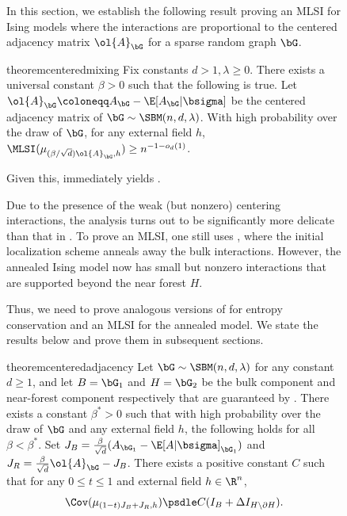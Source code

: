 \documentclass[11pt,letterpaper]{article}
\begin{document}
\begin{figure}
In this section, we establish the following result proving an MLSI for Ising models where the interactions are proportional to the centered adjacency matrix $\ol{A}_{\bG}$ for a sparse random graph $\bG$.

\begin{restatable}{theorem}{centeredmixing}
    \label{thm:main-centered-mixing}
    Fix constants $d > 1, \lambda \geq 0$. There exists a universal constant $\beta > 0$ such that the following is true. Let $\ol{A}_{\bG} \coloneqq A_{\bG} - \E[A_{\bG}|\bsigma]$ be the centered adjacency matrix of $\bG \sim \SBM(n, d, \lambda)$. With high probability over the draw of $\bG$, for any external field $h$, $\MLSI(\mu_{(\beta/\sqrt{d})\ol{A}_{\bG}, h}) \ge n^{-1-o_d(1)}$. 
\end{restatable}
Given this,  immediately yields .

Due to the presence of the weak (but nonzero) centering interactions, the analysis turns out to be significantly more delicate than that in . To prove an MLSI, one still uses , where the initial localization scheme anneals away the bulk interactions.
However, the annealed Ising model now has small but nonzero interactions that are supported beyond the near forest $H$. 

Thus, we need to prove analogous versions of  for entropy conservation and an MLSI for the annealed model.
We state the results below and prove them in subsequent sections.

\begin{restatable}{theorem}{centeredadjacency}
    \label{thm:centered-adjacency}
    Let $\bG \sim \SBM(n, d, \lambda)$ for any constant $d\ge 1$, and let $B = \bG_1$ and $H = \bG_2$ be the bulk component and near-forest component respectively that are guaranteed by .     
    There exists a constant $\beta^* > 0$ such that with high probability over the draw of $\bG$ and any external field $h$, the following holds for all $\beta < \beta^*$. Set $J_B = \frac{\beta}{\sqrt{d}}(A_{\bG_1} - \E[A| \bsigma]_{\bG_1})$ and $J_R = \frac{\beta}{\sqrt{d}}\ol{A}_{\bG} - J_B$. There exists a positive constant $C$ such that for any $0 \le t \le 1$ and external field $h \in \R^n$,
    \[ \Cov(\mu_{(1-t)J_B+ J_R,h}) \psdle C(I_{B} + \Delta I_{H \setminus \partial H}). \]
\end{restatable}


\end{figure}
\end{document}
